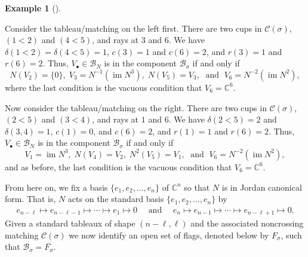 \documentclass[11pt]{amsart}
\theoremstyle{remark}
\theoremstyle{remark}
\theoremstyle{definition}
\theoremstyle{definition}
\theoremstyle{definition}
\newtheorem{eg_no_qed}[theorem]{Example}
\newenvironment{ex}[1][]{\begin{eg_no_qed}[#1]\renewcommand{\qedsymbol}{$\Diamond$}\pushQED{\qed}}{\popQED\end{eg_no_qed}}
\numberwithin{equation}{section}
\newcommand{\C}{\mathbb{C}}           %
\newcommand{\im}{\operatorname{im }}
\newcommand{\gd}{\delta}
\newcommand{\gs}{\sigma}
\newcommand{\cb}{\mathcal{B}}
\newcommand{\cc}{\mathcal{C}}
\newcommand{\SF}{\mathcal{B}}
\newcommand{\cupsigma}{\cc(\gs)}
\newcommand{\cell}{F_\gs}
\begin{document}
\begin{ex}
\begin{center}
\end{center}

Consider the tableau/matching on the left first. There are two cups in $\cupsigma$, $(1<2)$ and $(4<5)$, and rays at $3$ and $6$. We have $\gd(1<2)=\gd(4<5)=1$, $c(3)=1$ and $c(6)=2$, and $r(3)=1$ and $r(6)=2$. Thus, $V_\bullet\in \SF_N$ is in the component $\SF_\gs$ if and only if 
\[
N(V_2) = \{0\},\; V_3 = N^{-1}\left(\im N^{3} \right),\; N(V_5) = V_3,\; \text{ and } \; V_6 = N^{-2}\left(\im N^{2} \right),
\]
where the last condition is the vacuous condition that $V_6 = \C^6$. 

Now consider the tableau/matching on the right. There are two cups in $\cupsigma$, $(2<5)$ and $(3<4)$, and rays at $1$ and $6$. We have $\gd(2<5)=2$ and $\gd(3,4)=1$, $c(1)=0$, and $c(6)=2$, and $r(1)=1$ and $r(6)=2$. Thus, $V_\bullet\in \SF_N$ is in the component $\SF_\gs$ if and only if 
\[
V_1 = \im N^{3},\; N(V_4)=V_2,\; N^2(V_5) = V_1,\; \text{ and } \; V_6 = N^{-2}\left(\im N^{2} \right),
\]
and as before, the last condition is the vacuous condition that $V_6 = \C^6$. 
\end{ex}




From here on, we fix a basis $\{e_1, e_2, \ldots, e_n\}$ of $\C^n$ so that $N$ is in Jordan canonical form. That is, $N$ acts on the standard basis $\{e_1, e_2, \ldots, e_n\}$ by
\begin{eqnarray}\label{eqn.Jbasis}
e_{n-\ell} \mapsto e_{n-\ell-1}\mapsto \cdots \mapsto e_1\mapsto 0 \quad \text{ and } \quad e_n \mapsto e_{n-1}\mapsto \cdots \mapsto e_{n-\ell+1} \mapsto 0.
\end{eqnarray}
Given a standard tableaux of shape $(n-\ell, \ell)$ and the associated noncrossing matching $\cupsigma$ we now identify an open set of flags, denoted below by $\cell$, such that $\cb_\sigma = \overline{\cell}$. 
\end{document}
